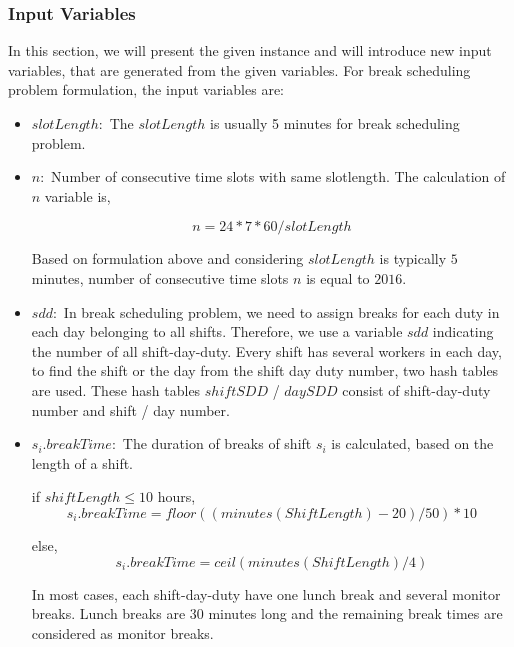 \subsubsection{Input Variables}

In this section, we will present the given instance and will introduce new input variables, that are generated from the given variables. For break scheduling problem formulation, the input variables are:

\begin{itemize}

\item $slotLength : $ The $slotLength$ is usually 5 minutes for break scheduling problem.

\item $n : $ Number of consecutive time slots with same slotlength. The calculation of $n$ variable is,

\begin{equation}
 n = 24 * 7 * 60 / slotLength
\end{equation}

Based on formulation above and considering $slotLength$ is typically $5$ minutes, number of consecutive time slots $n$ is equal to $2016$.

\item $sdd : $ In break scheduling problem, we need to assign breaks for each duty in each day belonging to all shifts. Therefore, we use a variable $sdd$ indicating the number of all shift-day-duty. Every shift has several workers in each day, to find the shift or the day from the shift day duty number, two hash tables are used. These hash tables $shiftSDD$ / $daySDD$ consist of shift-day-duty number and shift / day number.

\item $s_i.breakTime : $ The duration of breaks of shift $s_i$ is calculated, based on the length of a shift. 

if $shiftLength \le 10$ hours, 
\begin{equation}
s_i.breakTime    = floor( ( minutes(Shift Length) - 20) / 50 ) * 10
\end{equation}

else,
\begin{equation}
s_i.breakTime    = ceil (   minutes(Shift Length) / 4 )
\end{equation}

In most cases, each shift-day-duty have one lunch break and several monitor breaks. Lunch breaks are $30$ minutes long and the remaining break times are considered as monitor breaks. 


\end{itemize}
